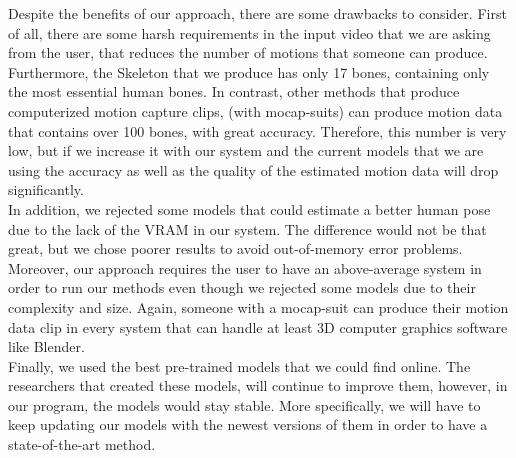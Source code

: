 Despite the benefits of our approach, there are some drawbacks to consider. First of all, there are some harsh requirements in the input video that we are asking from the user, that reduces the number of motions that someone can produce. \\

Furthermore, the Skeleton that we produce has only 17 bones, containing only the most essential human bones. In contrast, other methods that produce computerized motion capture clips, (with mocap-suits) can produce motion data that contains over 100 bones, with great accuracy. Therefore, this number is very low, but if we increase it with our system and the current models that we are using the accuracy as well as the quality of the estimated motion data will drop significantly.\\

In addition, we rejected some models that could estimate a better human pose due to the lack of the VRAM in our system. The difference would not be that great, but we chose poorer results to avoid out-of-memory error problems. \\

Moreover, our approach requires the user to have an above-average system in order to run our methods even though we rejected some models due to their complexity and size. Again, someone with a mocap-suit can produce their motion data clip in every system that can handle at least 3D computer graphics software like Blender.\\

Finally, we used the best pre-trained models that we could find online. The researchers that created these models, will continue to improve them, however, in our program, the models would stay stable. More specifically, we will have to keep updating our models with the newest versions of them in order to have a state-of-the-art method.\\